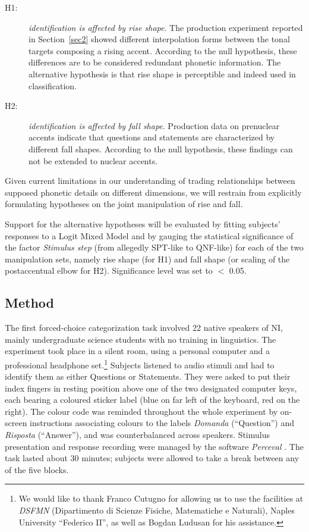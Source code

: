 \begin{description}
   \item[H1:] \textit{identification is affected by rise shape}. The production experiment reported in Section~\ref{sec2} showed different interpolation forms between the tonal targets composing a rising accent. According to the null hypothesis, these differences are to be considered redundant phonetic information. The alternative hypothesis is that rise shape is perceptible and indeed used in classification.
   \item[H2:] \textit{identification is affected by fall shape}. Production data on prenuclear accents indicate that questions and statements are characterized by different fall shapes. According to the null hypothesis, these findings can not be extended to nuclear accents.
\end{description}

Given current limitations in our understanding of trading relationships between supposed phonetic details on different dimensions, we will restrain from explicitly formulating hypotheses on the joint manipulation of rise and fall.

Support for the alternative hypotheses will be evaluated by fitting subjects' responses to a Logit Mixed Model and by gauging the statistical significance of the factor \textit{Stimulus step} (from allegedly SPT-like to QNF-like) for each of the two manipulation sets, namely rise shape (for H1) and fall shape (or scaling of the postaccentual elbow for H2). Significance level was set to $<$ 0.05.

\subsection{Method}\label{sec321}
The first forced-choice categorization task involved 22 native speakers of NI, mainly undergraduate science students with no training in linguistics. The experiment took place in a silent room, using a personal computer and a professional headphone set.\footnote{We would like to thank Franco Cutugno for allowing us to use the facilities at \textit{DSFMN} (Dipartimento di Scienze Fisiche, Matematiche e Naturali), Naples University ``Federico II'', as well as Bogdan Ludusan for his assistance.} Subjects listened to audio stimuli and had to identify them as either Questions or Statements. They were asked to put their index fingers in resting position above one of the two designated computer keys, each bearing a coloured sticker label (blue on far left of the keyboard, red on the right). The colour code was reminded throughout the whole experiment by on-screen instructions associating colours to the labels \textit{Domanda} (``Question'') and \textit{Risposta} (``Answer''), and was counterbalanced across speakers. Stimulus presentation and response recording were managed by the software \textit{Perceval} \citep{andre2003perceval}. The task lasted about 30 minutes; subjects were allowed to take a break between any of the five blocks.

